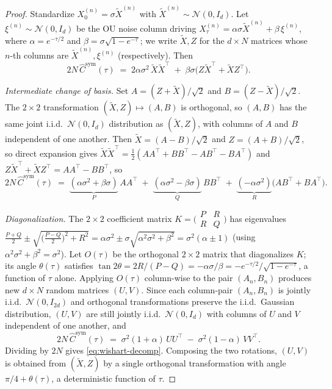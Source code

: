 \documentclass[10pt,a4paper]{amsart}
\newcommand{\R}{\mathbb{R}}
\begin{document}
\begin{proof}
Standardize $X_0^{(n)} = \sigma\tilde X^{(n)}$ with $\tilde X^{(n)} \sim \mathcal N(0, I_d)$.
Let $\xi^{(n)} \sim \mathcal N(0, I_d)$ be the OU noise column driving
$X_\tau^{(n)} = \alpha\sigma \tilde X^{(n)} + \beta\, \xi^{(n)}$, where
$\alpha = e^{-\tau/2}$ and $\beta = \sigma\sqrt{1 - e^{-\tau}}$; we write
$\tilde X, Z$ for the $d \times N$ matrices whose $n$-th columns are
$\tilde X^{(n)}, \xi^{(n)}$ (respectively). Then
\[
2N\,\hat C^{\mathrm{sym}}(\tau) \;=\; 2\alpha\sigma^2\,\tilde X\tilde X^\top \;+\; \beta\sigma\bigl(Z\tilde X^\top + \tilde X Z^\top\bigr).
\]

\emph{Intermediate change of basis.}
Set $A = (Z + \tilde X)/\sqrt 2$ and $B = (Z - \tilde X)/\sqrt 2$. The
$2\times 2$ transformation $(\tilde X, Z) \mapsto (A, B)$ is orthogonal,
so $(A, B)$ has the same joint i.i.d.\ $\mathcal N(0, I_d)$ distribution
as $(\tilde X, Z)$, with columns of $A$ and $B$ independent of one
another. Then $\tilde X = (A - B)/\sqrt 2$ and $Z = (A + B)/\sqrt 2$, so direct expansion gives
$\tilde X\tilde X^\top = \tfrac12(AA^\top + BB^\top - AB^\top - BA^\top)$
and $Z\tilde X^\top + \tilde X Z^\top = AA^\top - BB^\top$, so
\[
2N\,\hat C^{\mathrm{sym}}(\tau) \;=\; \underbrace{(\alpha\sigma^2 + \beta\sigma)}_{P}\,AA^\top \;+\; \underbrace{(\alpha\sigma^2 - \beta\sigma)}_{Q}\,BB^\top \;+\; \underbrace{(-\alpha\sigma^2)}_{R}\bigl(AB^\top + BA^\top\bigr).
\]

\emph{Diagonalization.}
The $2{\times}2$ coefficient matrix
$K = \bigl(\begin{smallmatrix}P&R\\R&Q\end{smallmatrix}\bigr)$ has
eigenvalues $\tfrac{P+Q}{2} \pm \sqrt{\bigl(\tfrac{P-Q}{2}\bigr)^2 + R^2} = \alpha\sigma^2 \pm \sigma\sqrt{\alpha^2\sigma^2 + \beta^2} = \sigma^2(\alpha \pm 1)$
(using $\alpha^2\sigma^2 + \beta^2 = \sigma^2$). Let $O(\tau)$ be the orthogonal
$2\times 2$ matrix that diagonalizes $K$; its angle $\theta(\tau)$
satisfies $\tan 2\theta = 2R/(P-Q) = -\alpha\sigma/\beta = -e^{-\tau/2}/\sqrt{1 - e^{-\tau}}$,
a function of $\tau$ alone. Applying $O(\tau)$ column-wise to the pair
$(A_n, B_n)$ produces new $d \times N$ random matrices $(U, V)$. Since each column-pair $(A_n, B_n)$ is jointly i.i.d.\ $\mathcal N(0, I_{2d})$ and orthogonal transformations preserve the i.i.d.\ Gaussian distribution, $(U, V)$ are still jointly i.i.d.\ $\mathcal N(0, I_d)$ with columns of $U$ and $V$ independent of one another, and
\[
2N\,\hat C^{\mathrm{sym}}(\tau) \;=\; \sigma^2(1 + \alpha)\,UU^\top \;-\; \sigma^2(1 - \alpha)\,VV^\top.
\]
Dividing by $2N$ gives \eqref{eq:wishart-decomp}. Composing the two
rotations, $(U, V)$ is obtained from $(\tilde X, Z)$ by a single
orthogonal transformation with angle $\pi/4 + \theta(\tau)$, a
deterministic function of $\tau$.
\end{proof}
\end{document}

